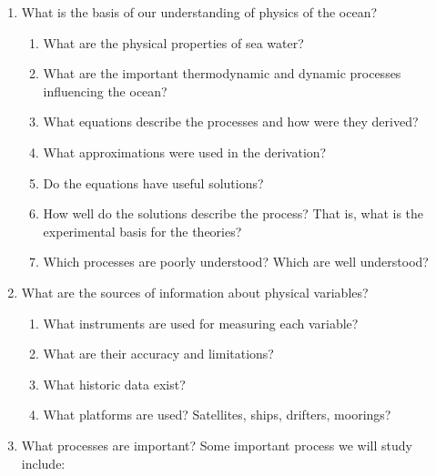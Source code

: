 \begin{enumerate}
\item What is the basis of our understanding of physics of the ocean?
\vspace{-0.5ex}
\begin{enumerate}
\item What are the physical properties of sea water?
\vspace{-0.5ex}
\item What are the important thermodynamic and dynamic processes
  influencing the ocean?
\vspace{-0.5ex}
\item What equations describe the processes and how were they derived?
\vspace{-0.5ex}
\item What approximations were used in the derivation?
\vspace{-0.5ex}
\item Do the equations have useful solutions?
\vspace{-0.5ex}
\item How well do the solutions describe the process? That is, what is
  the experimental basis for the theories?
\vspace{-0.5ex}
\item Which processes are poorly understood? Which are well
  understood?
\end{enumerate}
\item What are the sources of information about physical variables?
\vspace{-0.5ex}
\begin{enumerate}
\vspace{-0.5ex}
\item What instruments are used for measuring each variable?
\vspace{-0.5ex}
\item What are their accuracy and limitations?
\vspace{-0.5ex}
\item What historic data exist?
\vspace{-0.5ex}
\item What platforms are used? Satellites, ships,
  drifters, moorings?
\end{enumerate}
\vspace{-0.5ex}
\item What processes are important? Some important process we will
  study include:
\begin{enumerate}
\vspace{-0.5ex}

\end{enumerate}
\end{enumerate}
